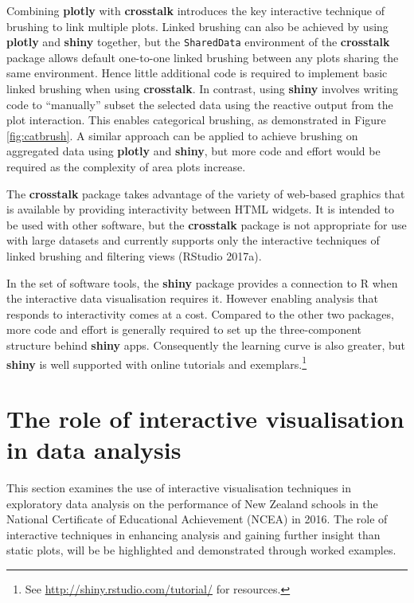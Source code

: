 \documentclass[]{book}
\let\rmarkdownfootnote\footnote%
\def\footnote{\protect\rmarkdownfootnote}
\theoremstyle{definition}
\theoremstyle{definition}
\theoremstyle{definition}
\theoremstyle{remark}
\begin{document}
Combining \textbf{plotly} with \textbf{crosstalk} introduces the key
interactive technique of brushing to link multiple plots. Linked
brushing can also be achieved by using \textbf{plotly} and
\textbf{shiny} together, but the \texttt{SharedData} environment of the
\textbf{crosstalk} package allows default one-to-one linked brushing
between any plots sharing the same environment. Hence little additional
code is required to implement basic linked brushing when using
\textbf{crosstalk}. In contrast, using \textbf{shiny} involves writing
code to ``manually'' subset the selected data using the reactive output
from the plot interaction. This enables categorical brushing, as
demonstrated in Figure \ref{fig:catbrush}. A similar approach can be
applied to achieve brushing on aggregated data using \textbf{plotly} and
\textbf{shiny}, but more code and effort would be required as the
complexity of area plots increase.

The \textbf{crosstalk} package takes advantage of the variety of
web-based graphics that is available by providing interactivity between
HTML widgets. It is intended to be used with other software, but the
\textbf{crosstalk} package is not appropriate for use with large
datasets and currently supports only the interactive techniques of
linked brushing and filtering views (RStudio 2017a).

In the set of software tools, the \textbf{shiny} package provides a
connection to R when the interactive data visualisation requires it.
However enabling analysis that responds to interactivity comes at a
cost. Compared to the other two packages, more code and effort is
generally required to set up the three-component structure behind
\textbf{shiny} apps. Consequently the learning curve is also greater,
but \textbf{shiny} is well supported with online tutorials and
exemplars.\footnote{See \url{http://shiny.rstudio.com/tutorial/} for
  resources.}

\chapter{The role of interactive visualisation in data
analysis}\label{the-role-of-interactive-visualisation-in-data-analysis}

This section examines the use of interactive visualisation techniques in
exploratory data analysis on the performance of New Zealand schools in
the National Certificate of Educational Achievement (NCEA) in 2016. The
role of interactive techniques in enhancing analysis and gaining further
insight than static plots, will be be highlighted and demonstrated
through worked examples.
\end{document}

